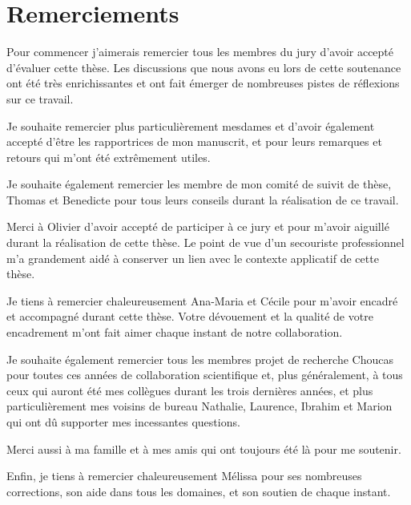\section*{Remerciements}

Pour commencer j'aimerais remercier tous les membres du jury d'avoir
accepté d'évaluer cette thèse. Les discussions que nous avons eu lors
de cette soutenance ont été très enrichissantes et ont fait émerger de
nombreuses pistes de réflexions sur ce travail.

Je souhaite remercier plus particulièrement mesdames
 et  d'avoir également accepté
d'être les rapportrices de mon manuscrit, et pour leurs remarques et
retours qui m'ont été extrêmement utiles.

Je souhaite également remercier les membre de mon comité de suivit de
thèse, Thomas  et Benedicte  pour tous
leurs conseils durant la réalisation de ce travail.

Merci à Olivier  d'avoir accepté de participer à ce jury et
pour m'avoir aiguillé durant la réalisation de cette thèse. Le point
de vue d'un secouriste professionnel m'a grandement aidé à conserver
un lien avec le contexte applicatif de cette thèse.

Je tiens à remercier chaleureusement Ana-Maria 
et Cécile  pour m'avoir encadré et accompagné durant
cette thèse. Votre dévouement et la qualité de votre encadrement m'ont
fait aimer chaque instant de notre collaboration.  

Je souhaite également remercier tous les membres projet de recherche
Choucas pour toutes ces années de collaboration scientifique et, plus
généralement, à tous ceux qui auront été mes collègues durant les
trois dernières années, et plus particulièrement mes voisins de bureau
Nathalie, Laurence, Ibrahim et Marion qui ont dû supporter mes
incessantes questions.

Merci aussi à ma famille et à mes amis qui ont toujours été là pour me
soutenir.

Enfin, je tiens à remercier chaleureusement Mélissa pour ses
nombreuses corrections, son aide dans tous les domaines, et son
soutien de chaque instant.

